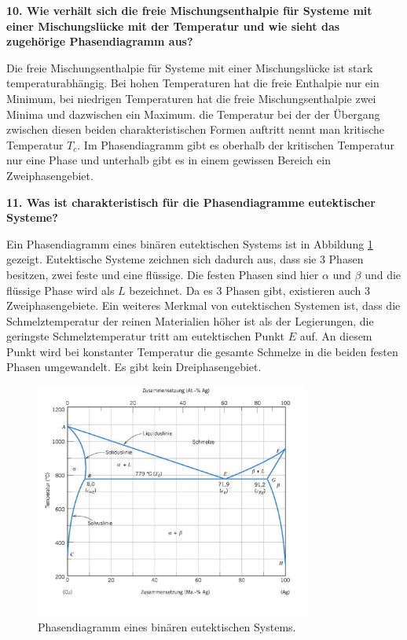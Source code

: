 \noindent\textbf{10. Wie verhält sich die freie Mischungsenthalpie für Systeme mit einer Mischungslücke mit der Temperatur und wie sieht das zugehörige Phasendiagramm aus?}\\
\begin{addmargin}[25pt]{0pt}
Die freie Mischungsenthalpie für Systeme mit einer Mischungslücke ist stark temperaturabhängig. Bei hohen Temperaturen hat die freie Enthalpie nur ein Minimum, bei niedrigen Temperaturen hat die freie Mischungsenthalpie zwei Minima und dazwischen ein Maximum. die Temperatur bei der der Übergang zwischen diesen beiden charakteristischen Formen auftritt nennt man kritische Temperatur $T_c$. Im Phasendiagramm gibt es oberhalb der kritischen Temperatur nur eine Phase und unterhalb gibt es in einem gewissen Bereich ein Zweiphasengebiet. \\
\end{addmargin}

\noindent\textbf{11. Was ist charakteristisch für die Phasendiagramme eutektischer Systeme?}\\
\begin{addmargin}[25pt]{0pt}
Ein Phasendiagramm eines binären eutektischen Systems ist in Abbildung \ref{fig:Phasendiagramm_eutektisch} gezeigt. Eutektische Systeme zeichnen sich dadurch aus, dass sie 3 Phasen besitzen, zwei feste und eine flüssige. Die festen Phasen sind hier $\alpha$ und $\beta$ und die flüssige Phase wird als $L$ bezeichnet. Da es 3 Phasen gibt, existieren auch 3 Zweiphasengebiete. Ein weiteres Merkmal von eutektischen Systemen ist, dass die Schmelztemperatur der reinen Materialien höher ist als der Legierungen, die geringste Schmelztemperatur tritt am eutektischen Punkt $E$ auf. An diesem Punkt wird bei konstanter Temperatur die gesamte Schmelze in die beiden festen Phasen umgewandelt. Es gibt kein Dreiphasengebiet.\\   
\begin{figure}[h]
    \centering
    \includegraphics[width = 0.8\textwidth]{images/Materialwissenschaften/eutektisch_Phasendiagramm.jpeg}
    \caption{Phasendiagramm eines binären eutektischen Systems.}
    \label{fig:Phasendiagramm_eutektisch}
\end{figure}
\end{addmargin}

